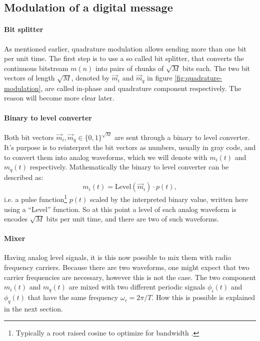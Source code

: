 
\subsection{Modulation of a digital message}

\paragraph{Bit splitter}

As mentioned earlier, quadrature modulation allows sending more than one bit per unit time. The first step is to use a so called bit splitter, that converts the continuous bitstream \(m(n)\) into pairs of chunks of \(\sqrt{M}\) bits each. The two bit vectors of length \(\sqrt{M}\), denoted by \(\vec{m}_i\) and \(\vec{m}_q\) in figure \ref{fig:quadrature-modulation}, are called in-phase and quadrature component respectively\cite{Hsu}. The reason will become more clear later.

\paragraph{Binary to level converter}


Both bit vectors \(\vec{m}_i, \vec{m}_q \in \{0,1\}^{\sqrt{M}}\) are sent through a binary to level converter. It's purpose is to reinterpret the bit vectors as numbers, usually in gray code, and to convert them into analog waveforms, which we will denote with \(m_i(t)\) and \(m_q(t)\) respectively. Mathematically the binary to level converter can be described as:
\begin{equation}
	m_i(t) = \text{Level}(\vec{m}_i) \cdot p(t),
\end{equation}
i.e. a pulse function\footnote{Typically a root raised cosine to optimize for bandwidth \cite{Hsu}.} \(p(t)\) scaled by the interpreted binary value, written here using a ``Level'' function. So at this point a level of each analog waveform is encodes \(\sqrt{M}\) bits per unit time, and there are two of such waveforms.


\paragraph{Mixer}

Having analog level signals, it is this now possible to mix them with radio frequency carriers. Because there are two waveforms, one might expect that two carrier frequencies are necessary, however this is not the case. The two component \(m_i(t)\) and \(m_q(t)\) are mixed with two different periodic signals \(\phi_i(t)\) and \(\phi_q(t)\) that have the same frequency \(\omega_c = 2\pi / T\). How this is possible is explained in the next section.


